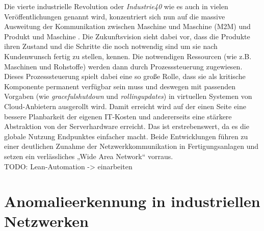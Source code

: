 Die vierte industrielle Revolution oder \textit{\Gls{Industrie40}} wie es auch in vielen Veröffentlichungen genannt wird, konzentriert sich nun auf die massive Ausweitung der Kommunikation zwischen Maschine und Maschine (\Gls{M2M}) und Produkt und Maschine \cite{lasi2014industry}. Die Zukunftsvision sieht dabei vor, dass die Produkte ihren Zustand und die Schritte die noch notwendig sind um sie nach Kundenwunsch fertig zu stellen, kennen. Die notwendigen Ressourcen (wie z.B. Maschinen und Rohstoffe) werden dann durch Prozesssteuerung zugewiesen. Dieses Prozesssteuerung spielt dabei eine so große Rolle, dass sie als kritische Komponente permanent verfügbar sein muss und deswegen mit passenden Vorgaben (wie \textit{\gls{gracefulshutdown}} und \textit{\Gls{rollingupdates}}) in virtuellen Systemen von Cloud-Anbietern ausgerollt wird. Damit erreicht wird auf der einen Seite eine bessere Planbarkeit der eigenen IT-Kosten und andererseits eine stärkere Abstraktion von der Serverhardware erreicht. Das ist erstrebenswert, da es die globale Nutzung Endpunktes einfacher macht\cite{wollschlaeger2017future}. Beide Entwicklungen führen zu einer deutlichen Zunahme der Netzwerkkommunikation in Fertigungsanlagen und setzen ein verlässliches „Wide Area Network“ vorraus.\\

TODO: Lean-Automation -> einarbeiten

\section{Anomalieerkennung in industriellen Netzwerken}
